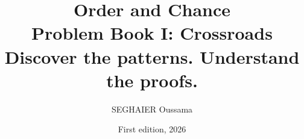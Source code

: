 \documentclass[11pt,openany]{book}
\title{\Huge\textbf{Order and Chance}\\[0.4em]\LARGE Problem Book I: Crossroads\\[0.6em]
\Large Discover the patterns. Understand the proofs.}
\author{SEGHAIER Oussama}
\date{First edition, 2026}
\begin{document}
\frontmatter
\makecover
\maketitle

\tableofcontents

\mainmatter















\end{document}
